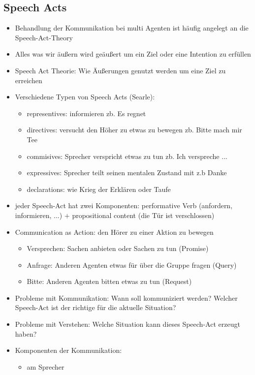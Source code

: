 \documentclass{article} %
\begin{document}
	\subsection{Speech Acts}
	\begin{itemize}
		\item Behandlung der Kommunikation bei multi Agenten ist häufig angelegt an die Speech-Act-Theory
		\item Alles was wir äußern wird geäußert um ein Ziel oder eine Intention zu erfüllen
		\item Speech Act Theorie: Wie Äußerungen genutzt werden um eine Ziel zu erreichen
		\item Verschiedene Typen von Speech Acts (Searle):
		\begin{itemize}
			\item representives: informieren zb. Es regnet
			\item directives: versucht den Höher zu etwas zu bewegen zb. Bitte mach mir Tee
			\item commisives: Sprecher verspricht etwas zu tun zb. Ich verspreche ...
			\item expressives: Sprecher teilt seinen mentalen Zustand mit z.b Danke
			\item declarations: wie Krieg der Erklären oder Taufe
		\end{itemize}
		\item jeder Speech-Act hat zwei Komponenten: performative Verb (anfordern, informieren, ...) $+$ propositional content (die Tür ist verschlossen)
		\item Communication as Action: den Hörer zu einer Aktion zu bewegen
		\begin{itemize}
			\item Versprechen: Sachen anbieten oder Sachen zu tun (Promise)
			\item Anfrage: Anderen Agenten etwas für über die Gruppe fragen (Query)
			\item Bitte: Anderen Agenten bitten etwas zu tun (Request)
		\end{itemize}
		\item Probleme mit Kommunikation: Wann soll kommuniziert werden? Welcher Speech-Act ist der richtige für die aktuelle Situation? 
		\item Probleme mit Verstehen: Welche Situation kann dieses Speech-Act erzeugt haben?
		\item Komponenten der Kommunikation:
		\begin{itemize}
			\item am Sprecher

\end{itemize}
\end{itemize}
\end{document}
